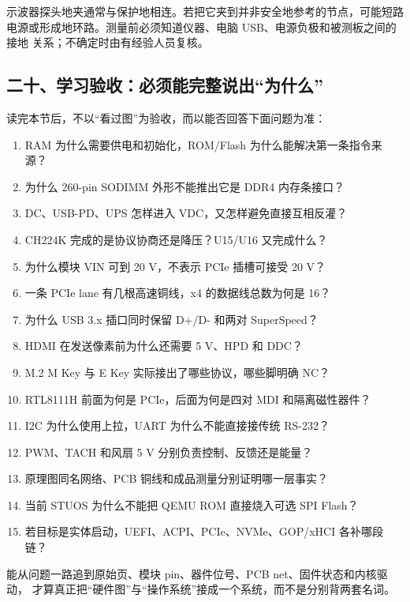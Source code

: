 \begin{failurebox}
示波器探头地夹通常与保护地相连。若把它夹到并非安全地参考的节点，可能短路
电源或形成地环路。测量前必须知道仪器、电脑 USB、电源负极和被测板之间的接地
关系；不确定时由有经验人员复核。
\end{failurebox}

\subsection{二十、学习验收：必须能完整说出“为什么”}

读完本节后，不以“看过图”为验收，而以能否回答下面问题为准：

\begin{enumerate}[leftmargin=2em]
  \item RAM 为什么需要供电和初始化，ROM/Flash 为什么能解决第一条指令来源？
  \item 为什么 260-pin SODIMM 外形不能推出它是 DDR4 内存条接口？
  \item DC、USB-PD、UPS 怎样进入 VDC，又怎样避免直接互相反灌？
  \item CH224K 完成的是协议协商还是降压？U15/U16 又完成什么？
  \item 为什么模块 VIN 可到 20 V，不表示 PCIe 插槽可接受 20 V？
  \item 一条 PCIe lane 有几根高速铜线，x4 的数据线总数为何是 16？
  \item 为什么 USB 3.x 插口同时保留 D+/D- 和两对 SuperSpeed？
  \item HDMI 在发送像素前为什么还需要 5 V、HPD 和 DDC？
  \item M.2 M Key 与 E Key 实际接出了哪些协议，哪些脚明确 NC？
  \item RTL8111H 前面为何是 PCIe，后面为何是四对 MDI 和隔离磁性器件？
  \item I2C 为什么使用上拉，UART 为什么不能直接接传统 RS-232？
  \item PWM、TACH 和风扇 5 V 分别负责控制、反馈还是能量？
  \item 原理图同名网络、PCB 铜线和成品测量分别证明哪一层事实？
  \item 当前 STUOS 为什么不能把 QEMU ROM 直接烧入可选 SPI Flash？
  \item 若目标是实体启动，UEFI、ACPI、PCIe、NVMe、GOP/xHCI 各补哪段链？
\end{enumerate}

能从问题一路追到原始页、模块 pin、器件位号、PCB net、固件状态和内核驱动，
才算真正把“硬件图”与“操作系统”接成一个系统，而不是分别背两套名词。
